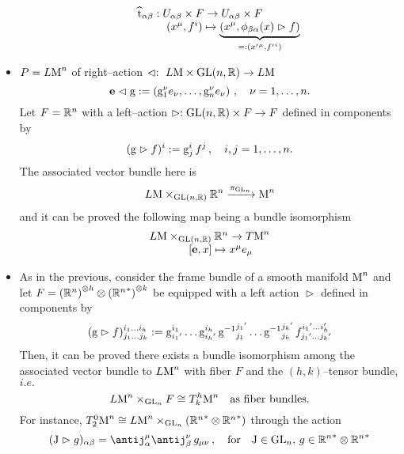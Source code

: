 $$\begin{matrix}
    \widehat{\t}_{\alpha\beta}:U_{\alpha\beta}\times F\to U_{\alpha\beta}\times F\\
    \qquad\qquad\qquad(x^\mu,f^i)\mapsto\underbrace{\left(x^\mu,\phi_{\beta\alpha}(x)\vartriangleright f\right)}_{=:({x'}^\mu,{f'}^i)}
    
\end{matrix}$$



\begin{example}\label{ex_ass}
    \begin{itemize}
        \item $P=L\text{\normalfont M}^n$ of right--action $\vartriangleleft:\,\,L\text{\normalfont M}\times\text{\normalfont GL}(n,\mathbb{R})\to L\text{\normalfont M}$
        $$\mathbf{e}\vartriangleleft\text{\normalfont g}:=\left(\text{\normalfont g}_1^\nu e_\nu,\hdots,\text{\normalfont g}_n^\nu e_\nu\right)\,,\quad\nu=1,\hdots,n.$$
        Let $F=\mathbb{R}^n$ with a left--action $\vartriangleright:\text{\normalfont GL}(n,\mathbb{R})\times F\to F$ defined in components by
        $$(\text{\normalfont g}\vartriangleright f)^i:=\text{\normalfont g}^i_j\,f^j\,,\quad i,j=1,\hdots,n.$$
        The associated vector bundle here is
        $$L\text{\normalfont M}\times_{\text{\normalfont GL}(n,\mathbb{R})}\mathbb{R}^n\xrightarrow{\pi_{\text{\normalfont GL}_n}}\text{\normalfont M}^n$$
        and it can be proved the following map being a bundle isomorphism
        $$\begin{matrix}
            L\text{\normalfont M}\times_{\text{\normalfont GL}(n,\mathbb{R})}\mathbb{R}^n\to T\text{\normalfont M}^n\\
            \qquad[\mathbf{e},x]\mapsto x^\mu e_\mu
        \end{matrix}$$
        
        \item As in the previous, consider the frame bundle of a smooth manifold $\text{\normalfont M}^n$ and let $F=\left({\mathbb{R}^n}\right)^{\otimes h}\otimes{\left({\mathbb{R}^n}^*\right)}^{\otimes k}$ be equipped with a left action $\vartriangleright$ defined in components by
        $$(\text{\normalfont g}\vartriangleright f)^{i_1\hdots i_h}_{j_1\hdots j_k}:={\text{\normalfont g}}^{i_1}_{{i_1}'}\hdots{\text{\normalfont g}}^{i_h}_{{i_h}'}\,{\text{\normalfont g}^{-1}}^{{j_1}'}_{j_1}\hdots{\text{\normalfont g}^{-1}}^{{j_k}'}_{j_k}\,f^{{i_1}'\hdots{i_h'}}_{{j_1}'\hdots{j_k}'}$$
        Then, it can be proved there exists a bundle isomorphism among the associated vector bundle to $L\text{\normalfont M}^n$ with fiber $F$ and the $(h,k)$--tensor bundle, $i.e.$
        $$L\text{\normalfont M}^n\times_{\text{\normalfont GL}_n}F\cong T^h_k\text{\normalfont M}^n \quad\text{as fiber bundles.}$$
        For instance, $T^0_2\text{\normalfont M}^n\cong L\text{\normalfont M}^n\times_{\text{\normalfont GL}_n}\left({\mathbb{R}^n}^*\otimes{\mathbb{R}^n}^*\right)$ through the action
        $$(\J\vartriangleright g)_{\alpha\beta}=\antij^\mu_\alpha\antij^\nu_\beta\,g_{\mu\nu}\,,\quad\text{for}\quad\J\in\GL_n,\,g\in{\R^n}^*\otimes{\R^n}^*$$
        

\end{itemize}
\end{example}
